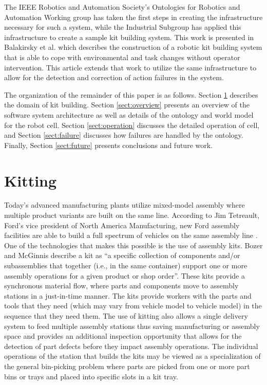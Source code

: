 The IEEE Robotics and Automation Society's Ontologies for Robotics and Automation Working group has taken the first steps in creating the 
infrastructure necessary for such a system, while the Industrial Subgroup has applied this infrastructure to create a sample kit building
system.  This work is presented in Balakirsky et al. \cite{balakirsky2013} which describes the construction of a robotic kit building
system that is able to cope with environmental and task changes without operator intervention. This article extends that work to utilize
the same infrastructure to allow for the detection and correction of action failures in the system.

The organization of the remainder of this paper is as follows. Section \ref{sect:kitting} describes the domain of kit building. Section \ref{sect:overview} presents
an overview of the software system architecture as well as details of the ontology and world model for the robot cell. Section \ref{sect:operation} discusses the detailed operation of cell, and Section \ref{sect:failure} discusses how failures are handled by the ontology. Finally, Section \ref{sect:future} presents
conclusions and future work.
%
%
\section{Kitting}
\label{sect:kitting}
Today's advanced manufacturing plants utilize mixed-model assembly where multiple product variants are built on the same line.  
According to Jim Tetreault, Ford’s vice president of North America Manufacturing, 
new Ford assembly facilities are able to build a full spectrum of vehicles on the same assembly line \cite{James2011}. One of the technologies that makes this possible
is the use of assembly kits.  Bozer and McGinnis \cite{Bozer1992} describe a kit as ``a specific
collection of components and/or subassemblies that together (i.e., in the same container) support one or more assembly
operations for a given product or shop order''. These  kits provide a synchronous material flow, where parts and components move to 
assembly stations in a just-in-time manner. The kits provide workers with the parts and tools that they need (which may vary from 
vehicle model to vehicle model) in the sequence that they need them. The use of kitting also allows a single delivery system to feed
multiple assembly stations thus saving manufacturing or assembly space \cite{Medbo2003} and provides an additional inspection opportunity 
that allows for the detection of part defects before they impact assembly operations. The individual operations of the station 
that builds the kits may be viewed as a specialization of the general
bin-picking problem \cite{Schyja2012} where parts are picked from one or more part bins or trays and placed into specific slots in a kit tray.

